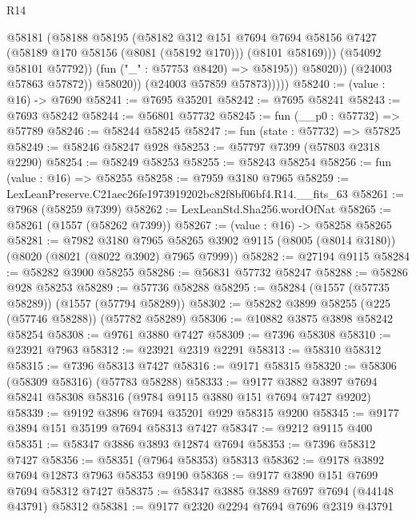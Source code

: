 \begin{lexlean}{R14}
\begin{coremodule}
                        @58181
                          (@58188
                            @58195
                            (@58182
                              @312
                              @151
                              @7694
                              @7694
                              @58156
                              @7427
                              (@58189 @170 @58156 (@8081 (@58192 @170)))
                              (@8101 @58169)))
                          (@54092 @58101 @57792))
                        (fun ("_" : @57753 @8420) => @58195))
                      @58020))
                  (@24003 @57863 @57872))
                @58020))
            (@24003 @57859 @57873)))))
@58240 := (value : @16) -> @7690
@58241 := @7695 @35201
@58242 := @7695 @58241
@58243 := @7693 @58242
@58244 := @56801 @57732
@58245 := fun (__p0 : @57732) => @57789
@58246 := @58244 @58245
@58247 := fun (state : @57732) => @57825
@58249 := @58246 @58247 @928
@58253 := @57797 @7399 (@57803 @2318 @2290)
@58254 := @58249 @58253
@58255 := @58243 @58254
@58256 := fun (value : @16) => @58255
@58258 := @7959 @3180 @7965
@58259 := LexLeanPreserve.C21aec26fe1973919202bc82f8bf06bf4.R14.__fits_63
@58261 := @7968 (@58259 @7399)
@58262 := LexLeanStd.Sha256.wordOfNat
@58265 := @58261 (@1557 (@58262 @7399))
@58267 := (value : @16) -> @58258 @58265
@58281 := @7982
    @3180
    @7965
    @58265
    @3902
    @9115
    (@8005 (@8014 @3180))
    (@8020 (@8021 (@8022 @3902) @7965 @7999))
@58282 := @27194 @9115
@58284 := @58282 @3900 @58255
@58286 := @56831 @57732 @58247
@58288 := @58286 @928 @58253
@58289 := @57736 @58288
@58295 := @58284 (@1557 (@57735 @58289)) (@1557 (@57794 @58289))
@58302 := @58282 @3899 @58255 (@225 (@57746 @58288)) (@57782 @58289)
@58306 := @10882 @3875 @3898 @58242 @58254
@58308 := @9761 @3880 @7427
@58309 := @7396 @58308
@58310 := @23921 @7963
@58312 := @23921 @2319 @2291
@58313 := @58310 @58312
@58315 := @7396 @58313 @7427
@58316 := @9171 @58315
@58320 := @58306 (@58309 @58316) (@57783 @58288)
@58333 := @9177 @3882 @3897 @7694 @58241 @58308 @58316 (@9784 @9115 @3880 @151 @7694 @7427 @9202)
@58339 := @9192 @3896 @7694 @35201 @929 @58315 @9200
@58345 := @9177 @3894 @151 @35199 @7694 @58313 @7427
@58347 := @9212 @9115 @400
@58351 := @58347 @3886 @3893 @12874 @7694
@58353 := @7396 @58312 @7427
@58356 := @58351 (@7964 @58353) @58313
@58362 := @9178 @3892 @7694 @12873 @7963 @58353 @9190
@58368 := @9177 @3890 @151 @7699 @7694 @58312 @7427
@58375 := @58347 @3885 @3889 @7697 @7694 (@44148 @43791) @58312
@58381 := @9177 @2320 @2294 @7694 @7696 @2319 @43791

\end{coremodule}
\end{lexlean}
